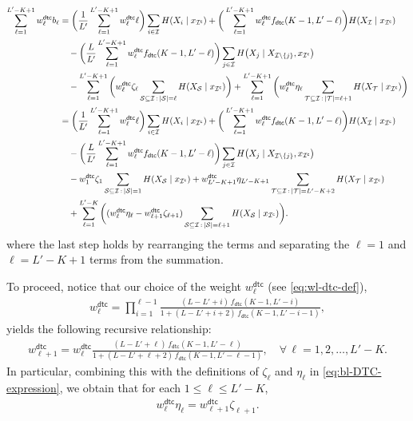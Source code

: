 \documentclass[english]{article}
\newcommand{\cS}{\mathcal{S}}
\newcommand{\cI}{\mathcal{I}}
\newcommand{\cT}{\mathcal{T}}
\newcommand{\dtc}{\mathsf{dtc}}
\begin{document}
\begin{align}
\sum_{\ell = 1}^{L'-K+1} w^\dtc_{\ell} b_{\ell}
& = \bigg(\frac{1}{L'} \sum_{\ell = 1}^{L'-K+1}  w^\dtc_{\ell} \ell\bigg) \sum_{i \in \cI} H(X_i \mid x_{\cI^\mathsf{c}})  + \bigg(\sum_{\ell = 1}^{L'-K+1} w^\dtc_{\ell} f_\dtc(K-1, L'-\ell) \bigg) H(X_{\cI} \mid x_{\cI^\mathsf{c}})  \notag \\
& \quad - \bigg( \frac{L}{L'}\sum_{\ell = 1}^{L'-K+1} w^\dtc_{\ell} f_\dtc(K-1, L'-\ell) \bigg) \sum_{j \in \cI} H\big(X_j \mid X_{\cI \setminus \{j\}}, x_{\cI^\mathsf{c}}\big)   \notag \\
& \quad  - \sum_{\ell = 1}^{L'-K+1} \bigg(w^\dtc_{\ell} \zeta_{\ell} \sum_{\cS \subseteq \cI \,:\, |\cS|=\ell} H(X_{\cS} \mid x_{\cI^\mathsf{c}}) \bigg) + \sum_{\ell = 1}^{L'-K+1} \bigg(w^\dtc_{\ell} \eta_{\ell} \sum_{\cT \subseteq \cI \,:\, |\cT|=\ell+1} H(X_{\cT} \mid x_{\cI^\mathsf{c}}) \bigg) \notag \\ 
& = \bigg(\frac{1}{L'} \sum_{\ell = 1}^{L'-K+1}  w^\dtc_{\ell} \ell\bigg) \sum_{i \in \cI} H(X_i \mid x_{\cI^\mathsf{c}})  + \bigg(\sum_{\ell = 1}^{L'-K+1} w^\dtc_{\ell} f_\dtc(K-1, L'-\ell) \bigg) H(X_{\cI} \mid x_{\cI^\mathsf{c}}) \notag \\
& \quad  - \bigg(\frac{L}{L'} \sum_{\ell = 1}^{L'-K+1} w^\dtc_{\ell} f_\dtc(K-1, L'-\ell) \bigg) \sum_{j \in \cI} H\big(X_j \mid X_{\cI \setminus \{j\}}, x_{\cI^\mathsf{c}}\big)  \notag \\
& \quad  - w^\dtc_{1} \zeta_{1} \sum_{\cS \subseteq \cI \,:\, |\cS|=1} H(X_{\cS} \mid x_{\cI^\mathsf{c}}) + w^\dtc_{L'-K+1} \eta_{L'-K+1} \sum_{\cT \subseteq \cI \,:\, |\cT|=L'-K+2} H(X_{\cT} \mid x_{\cI^\mathsf{c}}) \notag \\ 
& \quad  + \sum_{\ell = 1}^{L'-K} \bigg((w^\dtc_{\ell} \eta_{\ell} -w^\dtc_{\ell+1} \zeta_{\ell+1}) \sum_{\cS \subseteq \cI \,:\, |\cS|=\ell+1} H(X_{\cS} \mid x_{\cI^\mathsf{c}}) \bigg). \label{eq:weighted-sum-DTC-temp}
\end{align}
where the last step holds by rearranging the terms and separating the $\ell = 1$ and $\ell = L'-K+1$ terms from the summation.

To proceed, notice that our choice of the weight $w^\dtc_{\ell}$ (see \eqref{eq:wl-dtc-def}),
\begin{align*}
w_\ell^{\dtc} = \prod_{i = 1}^{\ell-1} \frac{(L-L'+i)\,f_\dtc(K-1, L'-i)}{1 + (L-L'+i+2)\,f_\dtc(K-1, L'-i-1)},
\end{align*}
yields the following recursive relationship:
\begin{align}
w^\dtc_{\ell + 1} = w^\dtc_{\ell} \frac{(L-L'+\ell)\,f_\dtc(K-1, L'-\ell)}{1 + (L-L'+\ell+2)\,f_\dtc(K-1, L'-\ell-1)}, \quad \forall\,\ell = 1, 2, \ldots, L'-K. \label{eq:weight-recursive-DTC-1}
\end{align}
In particular, combining this with the definitions of $\zeta_\ell$ and $\eta_\ell$ in \eqref{eq:bl-DTC-expression}, we obtain that for each $1\leq \ell \leq L'-K$,
\begin{align}
w^\dtc_{\ell} \eta_\ell = w^\dtc_{\ell + 1} \zeta_{\ell + 1}. \label{eq:weight-recursive-DTC}
\end{align}
\end{document}
